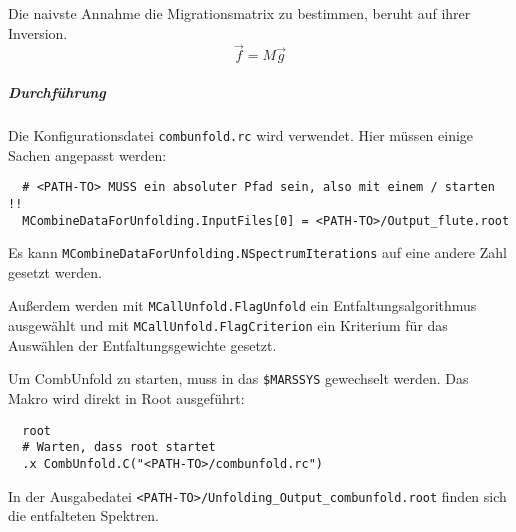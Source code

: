 Die naivste Annahme die Migrationsmatrix zu bestimmen,
beruht auf ihrer Inversion.
\begin{equation}
    \vec{f} = M \vec{g}
\end{equation}

\subparagraph{Durchführung}%

Die Konfigurationsdatei \texttt{combunfold.rc} wird verwendet.
Hier müssen einige Sachen angepasst werden:
\begin{lstlisting}
  # <PATH-TO> MUSS ein absoluter Pfad sein, also mit einem / starten !!
  MCombineDataForUnfolding.InputFiles[0] = <PATH-TO>/Output_flute.root
\end{lstlisting}
Es kann
\texttt{MCombineDataForUnfolding.NSpectrumIterations}
auf eine andere Zahl gesetzt werden.

Außerdem werden mit
\texttt{MCallUnfold.FlagUnfold}
ein Entfaltungsalgorithmus ausgewählt und mit
\texttt{MCallUnfold.FlagCriterion}
ein Kriterium für das Auswählen der Entfaltungsgewichte gesetzt.

Um CombUnfold zu starten, muss in das
\texttt{\$MARSSYS}
gewechselt werden.
Das Makro wird direkt in Root ausgeführt:
\begin{lstlisting}
  root
  # Warten, dass root startet
  .x CombUnfold.C("<PATH-TO>/combunfold.rc")
\end{lstlisting}

In der Ausgabedatei
\texttt{<PATH-TO>/Unfolding\_Output\_combunfold.root}
finden sich die entfalteten Spektren.
